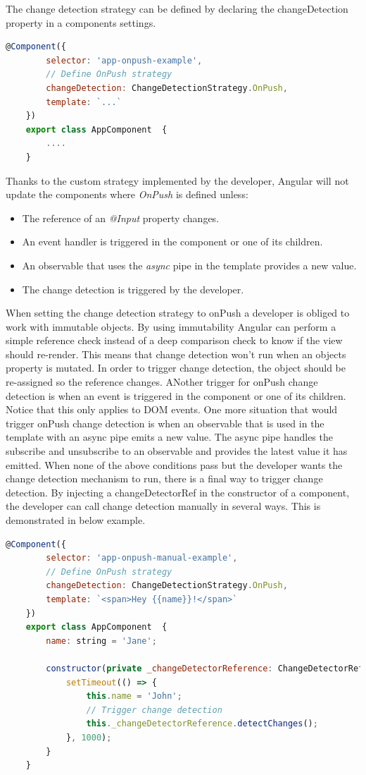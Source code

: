 The change detection strategy can be defined by declaring the changeDetection property in a components settings.
\begin{lstlisting}[language=JavaScript]
    @Component({
        selector: 'app-onpush-example',
        // Define OnPush strategy
        changeDetection: ChangeDetectionStrategy.OnPush,
        template: `...`
    })
    export class AppComponent  {
        ....      
    }
\end{lstlisting}

Thanks to the custom strategy implemented by the developer, Angular will not update the components where \emph{OnPush} is defined unless:
\begin{itemize}
    \item The reference of an \emph{@Input} property changes.
    \item An event handler is triggered in the component or one of its children.
    \item An observable that uses the \emph{async} pipe in the template provides a new value.
    \item The change detection is triggered by the developer.
\end{itemize}

When setting the change detection strategy to onPush a developer is obliged to work with immutable objects. By using immutability Angular can perform a simple reference check instead of a deep comparison check to know if the view should re-render. This means that change detection won't run when an objects property is mutated. In order to trigger change detection, the object should be re-assigned so the reference changes. ANother trigger for onPush change detection is when an event is triggered in the component or one of its children. Notice that this only applies to DOM events. \autocite{Basal2018} One more situation that would trigger onPush change detection is when an observable that is used in the template with an async pipe emits a new value. The async pipe handles the subscribe and unsubscribe to an observable and provides the latest value it has emitted. When none of the above conditions pass but the developer wants the change detection mechanism to run, there is a final way to trigger change detection. By injecting a changeDetectorRef in the constructor of a component, the developer can call change detection manually in several ways. This is demonstrated in below example.
\autocite{AngularUniOnpush2020}
\begin{lstlisting}[language=JavaScript]
    @Component({
        selector: 'app-onpush-manual-example',
        // Define OnPush strategy
        changeDetection: ChangeDetectionStrategy.OnPush,
        template: `<span>Hey {{name}}!</span>`
    })
    export class AppComponent  {
        name: string = 'Jane';
        
        constructor(private _changeDetectorReference: ChangeDetectorRef){
            setTimeout(() => {
                this.name = 'John';
                // Trigger change detection
                this._changeDetectorReference.detectChanges();
            }, 1000);
        }      
    }
\end{lstlisting}

